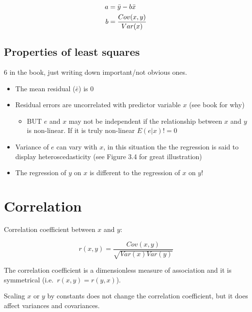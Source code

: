\documentclass[
]{book}
\providecommand{\tightlist}{%
  \setlength{\itemsep}{0pt}\setlength{\parskip}{0pt}}
\begin{document}
\begin{align}
  a &= \bar{y} - b\bar{x} \notag \\
  b &= \frac{Cov(x, y)} {Var(x)}
  \label{eq:intercept-and-slope}
\end{align}

\hypertarget{properties-of-least-squares}{%
\subsection{Properties of least squares}\label{properties-of-least-squares}}

6 in the book, just writing down important/not obvious ones.

\begin{itemize}
\tightlist
\item
  The mean residual (\(\bar{e}\)) is 0
\item
  Residual errors are uncorrelated with predictor variable \(x\) (see book for why)

  \begin{itemize}
  \tightlist
  \item
    BUT \(e\) and \(x\) may not be independent if the relationship between \(x\) and \(y\) is non-linear. If it is truly non-linear \(E(e|x) != 0\)
  \end{itemize}
\item
  Variance of \(e\) can vary with \(x\), in this situation the the regression is said to display heteroscedasticity (see Figure 3.4 for great illustration)
\item
  The regression of \(y\) on \(x\) is different to the regression of \(x\) on \(y\)!
\end{itemize}

\hypertarget{correlation}{%
\section{Correlation}\label{correlation}}

Correlation coefficient between \(x\) and \(y\):

\begin{equation}
  r(x, y) = \frac{Cov(x, y)} {\sqrt{Var(x) Var(y)}}
  \label{eq:correlation-coef}
\end{equation}

The correlation coefficient is a dimensionless measure of association and it is symmetrical (i.e.~\(r(x, y) = r(y, x)\)).

Scaling \(x\) or \(y\) by constants does not change the correlation coefficient, but it does affect variances and covariances.
\end{document}
